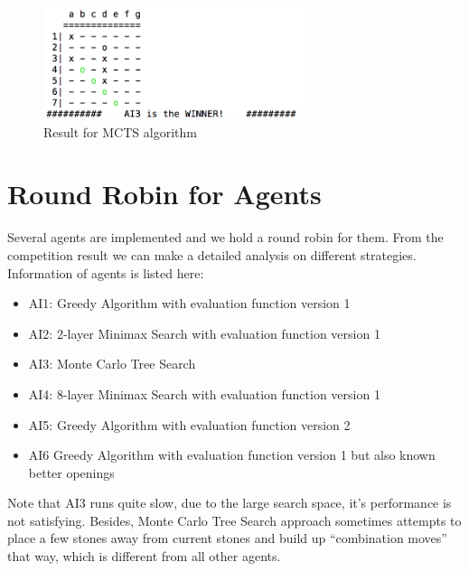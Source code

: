 \documentclass[12pt,a4paper]{article}
\begin{document}
\begin{figure}[H]
\centering\includegraphics[width=3in]{ai3.png}
\caption{Result for MCTS algorithm}
\end{figure}



\section{Round Robin for Agents}
Several agents are implemented and we hold a round robin for them. From the competition result we can make a detailed analysis on different strategies.\\
Information of agents is listed here:
\begin{itemize}
\item AI1: Greedy Algorithm with evaluation function version 1
\item AI2: 2-layer Minimax Search with evaluation function version 1
\item AI3: Monte Carlo Tree Search
\item AI4: 8-layer Minimax Search with evaluation function version 1
\item AI5: Greedy Algorithm with evaluation function version 2
\item AI6 Greedy Algorithm with evaluation function version 1 but also known better openings
\end{itemize}
Note that AI3 runs quite slow, due to the large search space, it's performance is not satisfying. Besides, Monte Carlo Tree Search approach sometimes attempts to place a few stones away from current stones and build up ``combination moves'' that way, which is different from all other agents.
\end{document}
